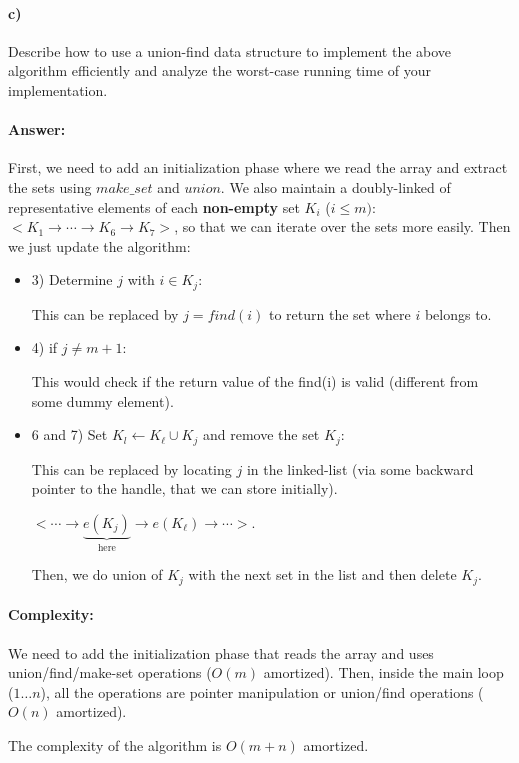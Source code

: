 \documentclass[a4paper]{article}
\begin{document}
\paragraph{c)} Describe how to use a union-find data structure to implement the above algorithm efficiently and analyze the worst-case running time of your implementation. 

\paragraph{Answer:} First, we need to add an initialization phase where we read the array and extract the sets using $make\_set$ and $union$. We also maintain a doubly-linked of representative elements of each \textbf{non-empty} set $K_i$ ($i \le m)$: $<K_1 \rightarrow \cdots \rightarrow K_6  \rightarrow K_7>$, so that we can iterate over the sets more easily. Then we just update the algorithm:

\begin{itemize}
\item 3) Determine $j$ with $i \in K_j$:

This can be replaced by $j = find(i)$ to return the set where $i$ belongs to.

\item 4) if $j \neq m+1$:

This would check if the return value of the find(i) is valid (different from some dummy element).

\item 6 and 7) Set $K_l \gets K_\ell \cup K_j$ and remove the set $K_j$:

This can be replaced by locating $j$ in the linked-list (via some backward pointer to the handle, that we can store initially).

$<\cdots \rightarrow \underbrace{e(K_j)}_\text{here} \rightarrow e(K_\ell) \rightarrow \cdots>$.

Then, we do union of $K_j$ with the next set in the list and then delete $K_j$.

\end{itemize}

\paragraph{Complexity: } We need to add the initialization phase that reads the array and uses union/find/make-set operations ($O(m)$ amortized).
Then, inside the main loop ($1 \ldots n$), all the operations are pointer manipulation or union/find operations ($O(n)$ amortized).

The complexity of the algorithm is $O(m+n)$ amortized. 
\end{document}
